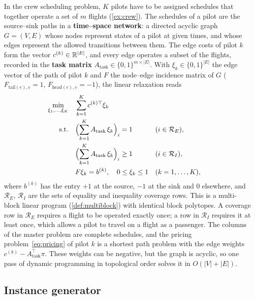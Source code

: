 In the crew scheduling problem, $K$ pilots have to be assigned schedules that together
operate a set of $m$ flights (\cref{ex:crew}). The schedules of a pilot are the source--sink
paths in a \textbf{time--space network}: a directed acyclic graph $G = (V,E)$ whose nodes
represent states of a pilot at given times, and whose edges represent the allowed transitions
between them. The edge costs of pilot $k$ form the vector $c^{(k)}\in\mathbb{R}^{|E|}$, and every edge
operates a subset of the flights, recorded in the \textbf{task matrix}
$A_{\mathrm{task}}\in\{0,1\}^{m\times|E|}$. With $\xi_k\in\{0,1\}^{|E|}$ the edge vector of the
path of pilot $k$ and $F$ the node--edge incidence matrix of $G$ ($F_{\mathrm{tail}(e),e} = 1$,
$F_{\mathrm{head}(e),e} = -1$), the linear relaxation reads
\begin{subequations} \label{eq:crew}
\begin{align}
\min_{\xi_1,\dots,\xi_K}\quad & \sum_{k=1}^{K} c^{(k)\top} \xi_k\\
\text{s.t.}\quad & \Bigl(\sum_{k=1}^{K}A_{\mathrm{task}}\,\xi_k\Bigr)_i = 1 && (i\in\mathcal{R}_E),
\label{eq:crew-eq}\\
& \Bigl(\sum_{k=1}^{K}A_{\mathrm{task}}\,\xi_k\Bigr)_i \ge 1 && (i\in\mathcal{R}_I),
\label{eq:crew-ineq}\\
& F \xi_k = b^{(k)},\quad 0\le \xi_k\le 1 && (k = 1,\dots,K),
\end{align}
\end{subequations}
where $b^{(k)}$ has the entry $+1$ at the source, $-1$ at the sink and $0$ elsewhere, and
$\mathcal{R}_E$, $\mathcal{R}_I$ are the sets of equality and inequality coverage rows. This is a
multi-block linear program (\cref{def:multiblock}) with identical block polytopes. A
coverage row in $\mathcal{R}_E$ requires a flight to be operated exactly once; a row in
$\mathcal{R}_I$ requires it at least once, which allows a pilot to travel on a flight as a
passenger. The columns of the master problem are complete schedules, and the pricing
problem~\eqref{eq:pricing} of pilot $k$ is a shortest path problem with the edge weights
$c^{(k)} - A_{\mathrm{task}}^\top\pi$. These weights can be negative, but the graph is
acyclic, so one pass of dynamic programming in topological order solves it in
$O(|V|+|E|)$.

\subsection{Instance generator}

